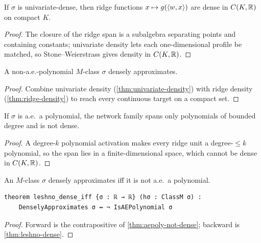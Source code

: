 \begin{theorem}\label{thm:ridge-density}
  \leanok
  If $\sigma$ is univariate-dense, then ridge functions $x\mapsto g(\left\langle w, x \right\rangle)$ are dense in
  $C(K,\mathbb{R})$ on compact $K$.
\end{theorem}
\begin{proof}\leanok
  The closure of the ridge span is a subalgebra separating points and containing constants;
  univariate density lets each one-dimensional profile be matched, so Stone--Weierstrass gives
  density in $C(K,\mathbb{R})$.
\end{proof}

\begin{theorem}\label{thm:leshno-dense}
  \leanok
  A non-a.e.-polynomial $M$-class $\sigma$ densely approximates.
\end{theorem}
\begin{proof}\leanok
  Combine univariate density (\cref{thm:univariate-density}) with ridge density
  (\cref{thm:ridge-density}) to reach every continuous target on a compact set.
\end{proof}

\begin{theorem}\label{thm:aepoly-not-dense}
  \leanok
  If $\sigma$ is a.e.\ a polynomial, the network family spans only polynomials of bounded degree
  and is not dense.
\end{theorem}
\begin{proof}\leanok
  A degree-$k$ polynomial activation makes every ridge unit a degree-$\le k$ polynomial, so the
  span lies in a finite-dimensional space, which cannot be dense in $C(K,\mathbb{R})$.
\end{proof}

\begin{theorem}\label{thm:leshno-iff}
  \leanok
  An $M$-class $\sigma$ densely approximates iff it is not a.e.\ a polynomial.
\end{theorem}
\begin{verbatim}
theorem leshno_dense_iff {σ : ℝ → ℝ} (hσ : ClassM σ) :
    DenselyApproximates σ ↔ ¬ IsAEPolynomial σ
\end{verbatim}
\begin{proof}\leanok
  Forward is the contrapositive of \cref{thm:aepoly-not-dense}; backward is
  \cref{thm:leshno-dense}.
\end{proof}
